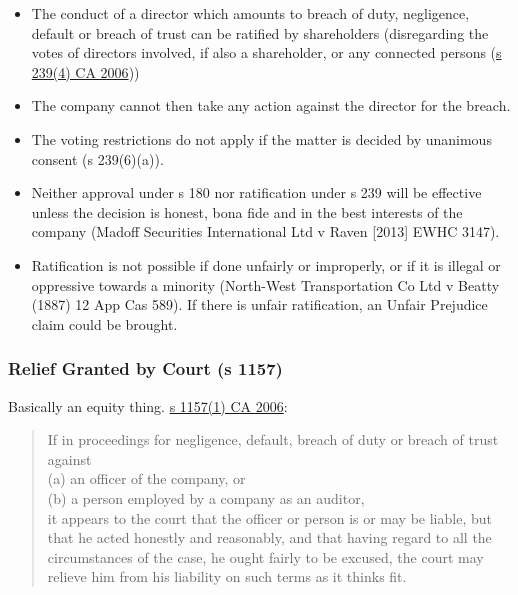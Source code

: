 \documentclass[
]{article}
\providecommand{\tightlist}{%
  \setlength{\itemsep}{0pt}\setlength{\parskip}{0pt}}
\begin{document}
\begin{itemize}
\tightlist
\item
  The conduct of a director which amounts to breach of duty, negligence,
  default or breach of trust can be ratified by shareholders
  (disregarding the votes of directors involved, if also a shareholder,
  or any connected persons
  (\href{https://www.legislation.gov.uk/ukpga/2006/46/section/239}{s
  239(4) CA 2006}))
\item
  The company cannot then take any action against the director for the
  breach.
\item
  The voting restrictions do not apply if the matter is decided by
  unanimous consent (s 239(6)(a)).
\item
  Neither approval under s 180 nor ratification under s 239 will be
  effective unless the decision is honest, bona fide and in the best
  interests of the company (Madoff Securities International Ltd v Raven
  {[}2013{]} EWHC 3147).
\item
  Ratification is not possible if done unfairly or improperly, or if it
  is illegal or oppressive towards a minority (North-West Transportation
  Co Ltd v Beatty (1887) 12 App Cas 589). If there is unfair
  ratification, an Unfair Prejudice claim could be brought.
\end{itemize}

\hypertarget{relief-granted-by-court-s-1157}{%
\subsubsection{Relief Granted by Court (s
1157)}\label{relief-granted-by-court-s-1157}}

Basically an equity thing.
\href{https://www.legislation.gov.uk/ukpga/2006/46/section/1157}{s
1157(1) CA 2006}:

\begin{quote}
If in proceedings for negligence, default, breach of duty or breach of
trust against\\
(a) an officer of the company, or\\
(b) a person employed by a company as an auditor,\\
it appears to the court that the officer or person is or may be liable,
but that he acted honestly and reasonably, and that having regard to all
the circumstances of the case, he ought fairly to be excused, the court
may relieve him from his liability on such terms as it thinks fit.
\end{quote}
\end{document}
